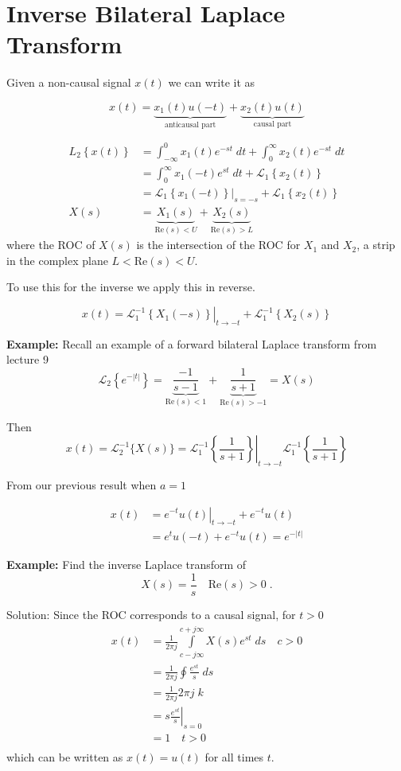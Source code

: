 \documentclass{article}
\begin{document}
\section{Inverse Bilateral Laplace Transform}

Given a non-causal signal $x(t)$ we can write it as

$$
x(t) =\underbrace{x_{1}(t) u(-t)}_{\text{anticausal part}} +\underbrace{x_{2}(t) u(t)}_{\text{causal part}}
$$
    
$$
\begin{aligned}
  L_2\left\{ x(t) \right\} &= \int_{-\infty}^{0} x_{1}(t) e^{-s t} \; dt + \int_{0}^{\infty} x_{2}(t) e^{-s t} \; dt\\
  &= \int_{0}^{\infty} x_{1}(-t) e^{s t} \; dt + \mathcal{L}_1 \left\{x_{2}(t)\right\}\\
  &= \left. \mathcal{L}_1 \left\{x_{1}(-t)\right\} \right|_{s = -s} + \mathcal{L}_1 \left\{x_{2}(t)\right\}\\
  X(s) &= \underbrace{X_1(s)}_{\text{Re}(s) < U} + \underbrace{X_2(s)}_{\text{Re}(s) > L}
\end{aligned}
$$
where the ROC of $X(s)$ is the intersection of the ROC for $X_1$ and $X_2$, a strip in the complex plane $L < \text{Re}(s) < U$.

To use this for the inverse we apply this in reverse.

$$
x(t) = \left. \mathcal{L}_1^{-1}\left\{X_1(-s)\right\}\right|_{t\rightarrow -t} +  \mathcal{L}_1^{-1}\left\{X_2(s)\right\}
$$


\textbf{Example:} Recall an example of a forward bilateral Laplace transform from lecture 9
$$
\mathcal{L}_{2}\left\{e^{-|t|}\right\}=\underbrace{\frac{-1}{s-1}}_{\text{Re}(s) < 1}+\underbrace{\frac{1}{s+1}}_{\text{Re}(s) > -1} = X(s)
$$

Then
$$
x(t)=\mathcal{L}_{2}^{-1}\{X(s)\}=\left.\mathcal{L}_{1}^{-1}\left\{\frac{1}{s+1}\right\}\right|_{t\rightarrow -t} \mathcal{L}_1^{-1}\left\{\frac{1}{s+1}\right\}
$$

From our previous result when $a=1$

$$
\begin{aligned}
x(t) & =\left.e^{-t} u(t)\right|_{t \rightarrow -t}+e^{-t} u(t) \\
& =e^{t} u(-t)+e^{-t} u(t)=e^{-|t|} 
\end{aligned}
$$

\textbf{Example:} Find the inverse Laplace transform of
$$
X(s) = \frac{1}{s} \quad \text{Re}(s) > 0\; .
$$

Solution: Since the ROC corresponds to a causal signal, for $t > 0$
$$
\begin{aligned}
x(t) &= \frac{1}{2 \pi j} \int\limits_{c-j \infty}^{c+j \infty} X(s) e^{s t} \; ds \quad c > 0 \\
  &= \frac{1}{2 \pi j} \oint \frac{e^{s t}}{s} \; ds\\
&= \frac{1}{2 \pi j} 2 \pi j \; k \\
&= \left.s \frac{e^{st}}{s}\right|_{s=0}\\
&=1 \quad t > 0 \\
\end{aligned}
$$
which can be written as $x(t) = u(t)$ for all times $t$.
\end{document}
